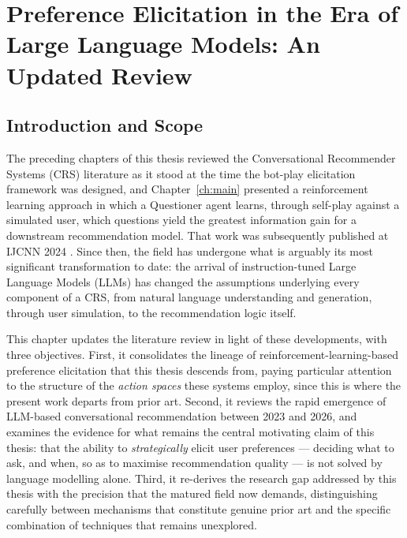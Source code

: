 \chapter{Preference Elicitation in the Era of Large Language Models: An Updated Review}
\label{ch:llm_lit}

\section{Introduction and Scope}

The preceding chapters of this thesis reviewed the Conversational Recommender Systems (CRS) literature as it stood at the time the bot-play elicitation framework was designed, and Chapter~\ref{ch:main} presented a reinforcement learning approach in which a Questioner agent learns, through self-play against a simulated user, which questions yield the greatest information gain for a downstream recommendation model. That work was subsequently published at IJCNN 2024 \citep{makarova2024learning}. Since then, the field has undergone what is arguably its most significant transformation to date: the arrival of instruction-tuned Large Language Models (LLMs) has changed the assumptions underlying every component of a CRS, from natural language understanding and generation, through user simulation, to the recommendation logic itself.

This chapter updates the literature review in light of these developments, with three objectives. First, it consolidates the lineage of reinforcement-learning-based preference elicitation that this thesis descends from, paying particular attention to the structure of the \textit{action spaces} these systems employ, since this is where the present work departs from prior art. Second, it reviews the rapid emergence of LLM-based conversational recommendation between 2023 and 2026, and examines the evidence for what remains the central motivating claim of this thesis: that the ability to \textit{strategically} elicit user preferences — deciding what to ask, and when, so as to maximise recommendation quality — is not solved by language modelling alone. Third, it re-derives the research gap addressed by this thesis with the precision that the matured field now demands, distinguishing carefully between mechanisms that constitute genuine prior art and the specific combination of techniques that remains unexplored.

